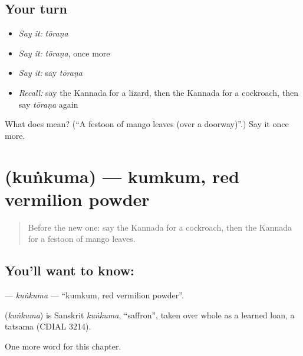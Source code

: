 \subsection*{Your turn}
\begin{itemize}
\raggedright
  \item \emph{Say it:} \emph{tōraṇa}
  \item \emph{Say it:} \emph{tōraṇa}, once more
  \item \emph{Say it:} say \emph{tōraṇa}
  \item \emph{Recall:} say the Kannada for a lizard, then the Kannada for a cockroach, then say \emph{tōraṇa} again
\end{itemize}

\begin{tcolorbox}[breakable,colback=teal!4,colframe=teal!35!black,title={Before you move on}]
What does  mean? (\textquotedblleft{}A festoon of mango leaves (over a doorway)\textquotedblright{}.) Say it once more.
\end{tcolorbox}
\section[\texorpdfstring{\kn{ಕುಂಕುಮ} (kuṅkuma)}{ಕುಂಕುಮ (kuṅkuma)}]{ (kuṅkuma) — kumkum, red vermilion powder}

\label{lesson:KA-C262-kunkuma}



\begin{quote}
Before the new one: say the Kannada for a cockroach, then the Kannada for a festoon of mango leaves.
\end{quote}

\subsection*{You'll want to know: }
\textbf{} — \emph{kuṅkuma} — \textquotedblleft{}kumkum, red vermilion powder\textquotedblright{}.

\begin{cousinweb}
\textbf{} (\emph{kuṅkuma}) is Sanskrit \emph{kuṅkuma}, \textquotedblleft{}saffron\textquotedblright{}, taken over whole as a learned loan, a tatsama (CDIAL 3214).
\end{cousinweb}

\begin{grammarlens}[title={What you've built}]
One more word for this chapter.
\end{grammarlens}

